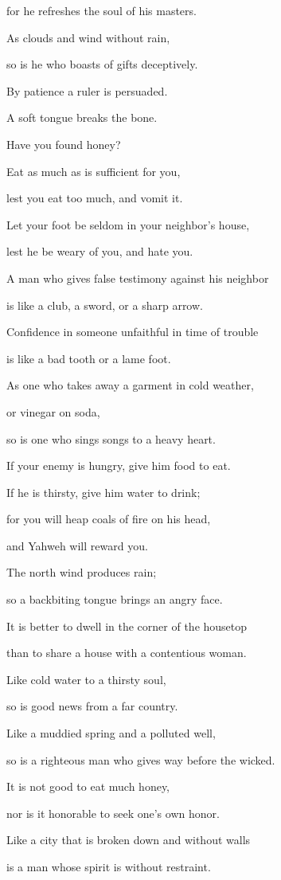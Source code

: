 {\par }{\QB for he refreshes the soul of his masters.
\par }{\Q {}As clouds and wind without rain,
\par }{\QB so is he who boasts of gifts deceptively.
\par }{\Q {}By patience a ruler is persuaded.
\par }{\QB A soft tongue breaks the bone.
\par }{\Q {}Have you found honey?
\par }{\QB Eat as much as is sufficient for you,
\par }{\QB lest you eat too much, and vomit it.
\par }{\Q {}Let your foot be seldom in your neighbor’s house,
\par }{\QB lest he be weary of you, and hate you.
\par }{\Q {}A man who gives false testimony against his neighbor
\par }{\QB is like a club, a sword, or a sharp arrow.
\par }{\Q {}Confidence in someone unfaithful in time of trouble
\par }{\QB is like a bad tooth or a lame foot.
\par }{\Q {}As one who takes away a garment in cold weather,
\par }{\QB or vinegar on soda,
\par }{\QB so is one who sings songs to a heavy heart.
\par }{\Q {}If your enemy is hungry, give him food to eat.
\par }{\QB If he is thirsty, give him water to drink;
\par }{\Q {}for you will heap coals of fire on his head,
\par }{\QB and Yahweh will reward you.
\par }{\Q {}The north wind produces rain;
\par }{\QB so a backbiting tongue brings an angry face.
\par }{\Q {}It is better to dwell in the corner of the housetop
\par }{\QB than to share a house with a contentious woman.
\par }{\Q {}Like cold water to a thirsty soul,
\par }{\QB so is good news from a far country.
\par }{\Q {}Like a muddied spring and a polluted well,
\par }{\QB so is a righteous man who gives way before the wicked.
\par }{\Q {}It is not good to eat much honey,
\par }{\QB nor is it honorable to seek one’s own honor.
\par }{\Q {}Like a city that is broken down and without walls
\par }{\QB is a man whose spirit is without restraint.

}
